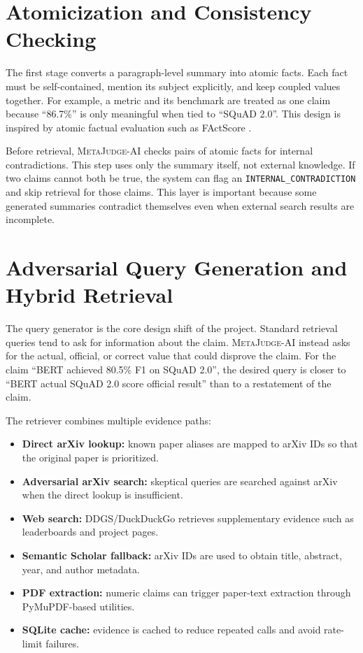 \documentclass[12pt, a4paper]{report}
\newcommand{\sys}{\textsc{MetaJudge-AI}}
\begin{document}
\section{Atomicization and Consistency Checking}

The first stage converts a paragraph-level summary into atomic facts. Each fact
must be self-contained, mention its subject explicitly, and keep coupled values
together. For example, a metric and its benchmark are treated as one claim
because ``86.7\%'' is only meaningful when tied to ``SQuAD 2.0''. This design is
inspired by atomic factual evaluation such as FActScore \cite{min2023}.

Before retrieval, \sys{} checks pairs of atomic facts for internal
contradictions. This step uses only the summary itself, not external knowledge.
If two claims cannot both be true, the system can flag an
\texttt{INTERNAL\_CONTRADICTION} and skip retrieval for those claims. This layer
is important because some generated summaries contradict themselves even when
external search results are incomplete.

\section{Adversarial Query Generation and Hybrid Retrieval}

The query generator is the core design shift of the project. Standard retrieval
queries tend to ask for information about the claim. \sys{} instead asks for the
actual, official, or correct value that could disprove the claim. For the claim
``BERT achieved 80.5\% F1 on SQuAD 2.0'', the desired query is closer to
``BERT actual SQuAD 2.0 score official result'' than to a restatement of the
claim.

The retriever combines multiple evidence paths:

\begin{itemize}
    \item \textbf{Direct arXiv lookup:} known paper aliases are mapped to arXiv IDs so that the original paper is prioritized.
    \item \textbf{Adversarial arXiv search:} skeptical queries are searched against arXiv when the direct lookup is insufficient.
    \item \textbf{Web search:} DDGS/DuckDuckGo retrieves supplementary evidence such as leaderboards and project pages.
    \item \textbf{Semantic Scholar fallback:} arXiv IDs are used to obtain title, abstract, year, and author metadata.
    \item \textbf{PDF extraction:} numeric claims can trigger paper-text extraction through PyMuPDF-based utilities.
    \item \textbf{SQLite cache:} evidence is cached to reduce repeated calls and avoid rate-limit failures.
\end{itemize}
\end{document}
